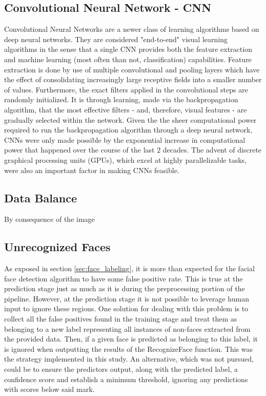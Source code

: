 \documentclass[11pt]{article}
\begin{document}
    \subsection{Convolutional Neural Network - CNN}\label{CNN}
        Convolutional Neural Networks are a newer class of learning algorithms based on deep neural networks. They are considered "end-to-end" visual learning algorithms in the sense that a single CNN provides both the feature extraction and machine learning (most often than not, classification) capabilities. Feature extraction is done by use of multiple convolutional and pooling layers which have the effect of consolidating increasingly large receptive fields into a smaller number of values. Furthermore, the exact filters applied in the convolutional steps are randomly initialized. It is through learning, made via the backpropagation algorithm, that the most effective filters - and, therefore, visual features - are gradually selected within the network. Given the the sheer computational power required to run the backpropagation algorithm through a deep neural network, CNNs were only made possible by the exponential increase in computational power that happened over the course of the last 2 decades. The advent of discrete graphical processing units (GPUs), which excel at highly parallelizable tasks, were also an important factor in making CNNs feasible.

    \subsection{Data Balance}
        By consequence of the image

    \subsection{Unrecognized Faces}\label{sec:non-faces}
        As exposed in section \ref{sec:face_labeling}, it is more than expected for the facial face detection algorithm to have some false positive rate. This is true at the prediction stage just as much as it is during the preprocessing portion of the pipeline. However, at the prediction stage it is not possible to leverage human input to ignore these regions. One solution for dealing with this problem is to collect all the false positives found in the training stage and treat them as belonging to a new label representing all instances of non-faces extracted from the provided data. Then, if a given face is predicted as belonging to this label, it is ignored when outputting the results of the RecognizeFace function. This was the strategy implemented in this study. An alternative, which was not pursued, could be to ensure the predictors output, along with the predicted label, a confidence score and establish a minimum threshold, ignoring any predictions with scores below said mark.
\end{document}
